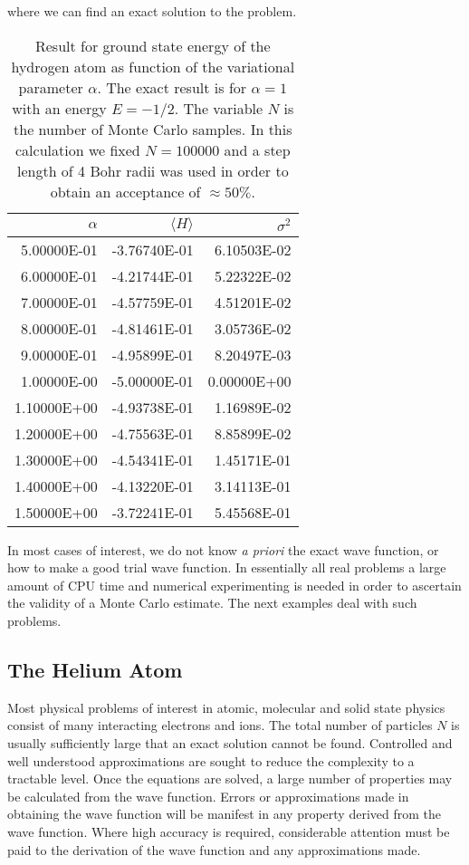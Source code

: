 where we can find an exact solution to the problem.
\begin{table}[hbtp]
\begin{center}
\caption{Result  for ground state energy of the hydrogen atom as
         function of the variational parameter $\alpha$. The exact result
         is for $\alpha=1$ with an energy $E=-1/2$. The variable $N$ is the number of Monte Carlo
         samples. In this calculation we fixed $N=100000$ and a step length of 
         4 Bohr radii  
         was used in order to obtain an acceptance of $\approx 50\%$.
         \label{tab:tabhydrogenvmc}}
\begin{tabular}{rrr}\hline
$\alpha$&$\langle H \rangle $&$\sigma^2$ \\\hline
 5.00000E-01 & -3.76740E-01 &  6.10503E-02 \\ 
 6.00000E-01 & -4.21744E-01 &  5.22322E-02 \\ 
 7.00000E-01 & -4.57759E-01 &  4.51201E-02 \\ 
 8.00000E-01 & -4.81461E-01 &  3.05736E-02 \\ 
 9.00000E-01 & -4.95899E-01 &  8.20497E-03 \\ 
 1.00000E-00 & -5.00000E-01 &  0.00000E+00 \\ 
 1.10000E+00 & -4.93738E-01 &  1.16989E-02 \\ 
 1.20000E+00 & -4.75563E-01 &  8.85899E-02 \\ 
 1.30000E+00 & -4.54341E-01 &  1.45171E-01 \\ 
 1.40000E+00 & -4.13220E-01 &  3.14113E-01 \\ 
 1.50000E+00 & -3.72241E-01 &  5.45568E-01 \\ \hline
\end{tabular}
\end{center}
\end{table}
In most cases of interest, we do not know {\em a priori} the exact wave function,
or how to make a good trial wave function. 
In essentially all real problems a large amount of CPU time 
and numerical experimenting is needed in order to ascertain the 
validity of a Monte Carlo estimate. 
The next examples 
deal with such problems.


\subsection{The Helium Atom}


Most physical problems of interest in atomic, molecular and solid state 
physics consist of  many 
interacting electrons and ions. 
The total number of particles $N$ is usually sufficiently large
that an exact solution cannot be found. 
Controlled and well understood approximations are sought to 
reduce the complexity to a tractable level. Once
the equations are solved, a large number of properties 
may be calculated from the wave function. 
Errors or approximations made in obtaining the
wave function will be manifest in any property derived from the wave function. 
Where high accuracy is required, considerable attention must be paid to
the derivation of the wave function and any approximations made. 


